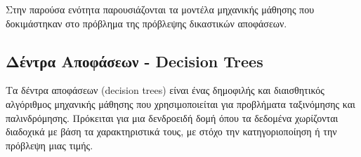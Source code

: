\documentclass[diploma]{softlab-thesis}
\begin{document}
Στην παρούσα ενότητα παρουσιάζονται τα μοντέλα μηχανικής μάθησης που δοκιμάστηκαν στο πρόβλημα της πρόβλεψης δικαστικών αποφάσεων.


\subsection{Δέντρα Αποφάσεων - Decision Trees}

Τα δέντρα αποφάσεων (decision trees) είναι ένας δημοφιλής και διαισθητικός αλγόριθμος μηχανικής μάθησης που χρησιμοποιείται για προβλήματα ταξινόμησης και παλινδρόμησης. Πρόκειται για μια δενδροειδή δομή όπου τα δεδομένα χωρίζονται διαδοχικά με βάση τα χαρακτηριστικά τους, με στόχο την κατηγοριοποίηση ή την πρόβλεψη μιας τιμής.
\end{document}
